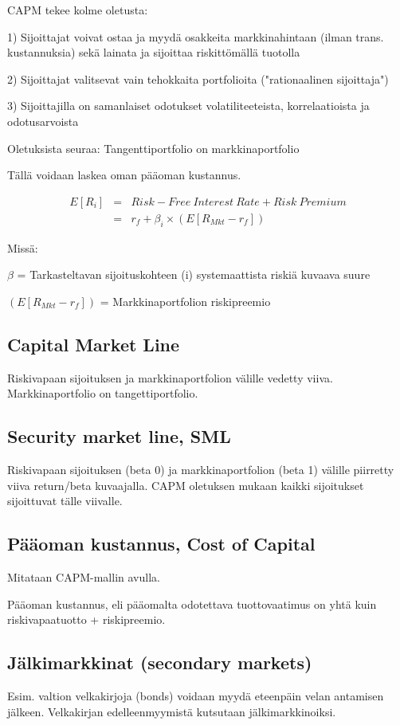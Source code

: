 \documentclass[a4paper]{article}
\begin{document}
CAPM tekee kolme oletusta:

1) Sijoittajat voivat ostaa ja myydä osakkeita markkinahintaan (ilman trans. kustannuksia) sekä lainata ja sijoittaa riskittömällä tuotolla

2) Sijoittajat valitsevat vain tehokkaita portfolioita ("rationaalinen sijoittaja")

3) Sijoittajilla on samanlaiset odotukset volatiliteeteista, korrelaatioista ja odotusarvoista

Oletuksista seuraa: Tangenttiportfolio on markkinaportfolio

Tällä voidaan laskea oman pääoman kustannus.

\[
\begin{array}{lcl}
E[R_i] & = & Risk-Free\ Interest\ Rate + Risk\ Premium \\
 & = & r_f + \beta_i \times ( E [R_{Mkt} - r_f] )
\end{array}
\]

Missä:

$\beta$ = Tarkasteltavan sijoituskohteen (i) systemaattista riskiä kuvaava suure

$( E [R_{Mkt} - r_f] )$ = Markkinaportfolion riskipreemio

\subsection{Capital Market Line}

Riskivapaan sijoituksen ja markkinaportfolion välille vedetty viiva. Markkinaportfolio on tangettiportfolio.

\subsection{Security market line, SML}

Riskivapaan sijoituksen (beta 0) ja markkinaportfolion (beta 1) välille piirretty viiva return/beta kuvaajalla. CAPM oletuksen mukaan kaikki sijoitukset sijoittuvat tälle viivalle.

\subsection{Pääoman kustannus, Cost of Capital}

Mitataan CAPM-mallin avulla. 

Pääoman kustannus, eli pääomalta odotettava tuottovaatimus on yhtä kuin riskivapaatuotto + riskipreemio.

\subsection{Jälkimarkkinat (secondary markets)}

Esim. valtion velkakirjoja (bonds) voidaan myydä eteenpäin velan antamisen jälkeen. Velkakirjan edelleenmyymistä kutsutaan jälkimarkkinoiksi.
\end{document}
